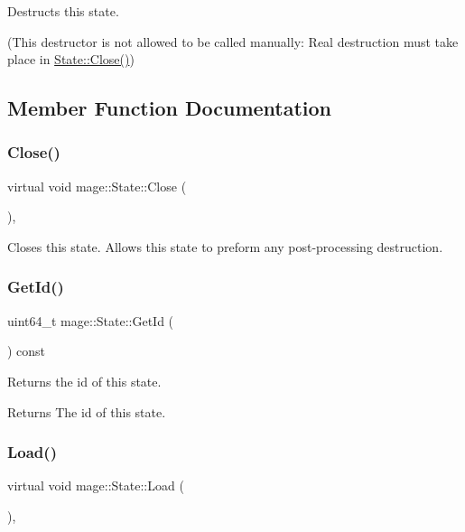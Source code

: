 Destructs this state.

(This destructor is not allowed to be called manually\+: Real destruction must take place in \hyperlink{classmage_1_1_state_a1edd5d756566f5b689c7a381f4e6b301}{State\+::\+Close()}) 

\subsection{Member Function Documentation}
\hypertarget{classmage_1_1_state_a1edd5d756566f5b689c7a381f4e6b301}{}\label{classmage_1_1_state_a1edd5d756566f5b689c7a381f4e6b301} 
\subsubsection{\texorpdfstring{Close()}{Close()}}
{\footnotesize\ttfamily virtual void mage\+::\+State\+::\+Close (\begin{DoxyParamCaption}{ }\end{DoxyParamCaption})\hspace{0.3cm}{\ttfamily [protected]}, {\ttfamily [virtual]}}

Closes this state. Allows this state to preform any post-\/processing destruction. \hypertarget{classmage_1_1_state_a07c383a809204ba12a2bbfb22d2977d5}{}\label{classmage_1_1_state_a07c383a809204ba12a2bbfb22d2977d5} 
\subsubsection{\texorpdfstring{Get\+Id()}{GetId()}}
{\footnotesize\ttfamily uint64\+\_\+t mage\+::\+State\+::\+Get\+Id (\begin{DoxyParamCaption}{ }\end{DoxyParamCaption}) const}

Returns the id of this state.

\begin{DoxyReturn}{Returns}
The id of this state. 
\end{DoxyReturn}
\hypertarget{classmage_1_1_state_aa88ace504c82ad372e5e599746f3ebda}{}\label{classmage_1_1_state_aa88ace504c82ad372e5e599746f3ebda} 
\subsubsection{\texorpdfstring{Load()}{Load()}}
{\footnotesize\ttfamily virtual void mage\+::\+State\+::\+Load (\begin{DoxyParamCaption}{ }\end{DoxyParamCaption})\hspace{0.3cm}{\ttfamily [protected]}, {\ttfamily [virtual]}}

